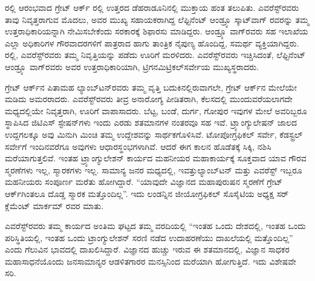 ರಲ್ಲಿ ಆರಂಭವಾದ ಗ್ರೇಟ್​ ಆರ್ಕ್ ರಲ್ಲಿ ಉತ್ತರದ ಡೆಹರಾಡೂನಿನಲ್ಲಿ ಮುಕ್ತಾಯ ಹಂತ ತಲುಪಿತು. ಎವರೆಸ್ಟ್​ರವರು ತಾವು ನಿವೃತ್ತರಾಗುವ ಮೊದಲು, ಅವರ ಮುಖ್ಯ ಸಹಾಯಕರಾಗಿದ್ದ ಲೆಫ್ಟಿನೆಂಟ್​ ಆಂಡ್ರ್ಯೂ ಸ್ಕಾಟ್​ ವಾಗ್​ ರವರನ್ನು ತಮ್ಮ ಉತ್ತರಾಧಿಕಾರಿಯನ್ನಾಗಿ ನೇಮಿಸಬೇಕೆಂದು ಸರಕಾರಕ್ಕೆ ಶಿಫಾರಸು ಮಾಡಿದ್ದರು. ಆಂಡ್ರ್ಯೂ ವಾಗ್​ರವರು ಸಹ ಇಲಾಖೆಯ ಎಲ್ಲಾ ಅಧಿಕಾರಿಗಳ ಗೌರವಾದರಗಳಿಗೆ ಪಾತ್ರರಾದ ಹಾಗು ತಾಂತ್ರಿಕ ನೈಪುಣ್ಯ ಹೊಂದಿದ್ದ, ಸಮರ್ಥ ವ್ಯಕ್ತಿಯಾಗಿದ್ದರು.  ರಲ್ಲಿ, ಎವರೆಸ್ಟ್​ರವರು ತಮ್ಮ ನಿವೃತ್ತಿಯನ್ನು ಪಡೆದು ಊರಿಗೆ ಮರಳಿದರು. ಎವರೆಸ್ಟ್​ರವರು ಇಚ್ಚಿಸಿದಂತೆ, ಲೆಫ್ಟಿನೆಂಟ್​ ಆಂಡ್ರ್ಯೂ ವಾಗ್​ರವರು ಅವರ ಉತ್ತರಾಧಿಕಾರಿಯಾಗಿ, ಟ್ರಿಗನಮಿಟ್ರಿಕಲ್​ ಸರ್ವೇಯ ಮುಖ್ಯಸ್ಥರಾದರು.

ಗ್ರೇಟ್​ ಆರ್ಕ್‌ನ ಪಿತಾಮಹ ಲ್ಯಾಂಬ್​ಟನ್​ರವರು ತಮ್ಮ ವೃತ್ತಿ ಬದುಕಿನಲ್ಲಿರುವಾಗಲೇ, ಗ್ರೇಟ್​ ಆರ್ಕ್‌ನ ಮೇಲೆಯೇ ಮಡಿದು ಅಮರರಾದರು. ಎವರೆಸ್ಟ್​ರವರು ತೀವ್ರ ಅನಾರೋಗ್ಯ ಪೀಡಿತರಾಗಿ, ಕೆಲಸದಲ್ಲಿ ಮುಂದುವರೆಯಲಾಗದೇ ಮಧ್ಯದಲ್ಲಿಯೇ ನಿವೃತ್ತರಾಗಿ, ಊರಿಗೆ ವಾಪಾಸಾದರು. ಬೆಟ್ಟ, ಬಂಡೆ, ದುರ್ಗ, ಗೋಪುರ ಇವುಗಳ ಮೇಲೆ ಅವರಿಬ್ಬರೂ ಸ್ಥಾಪಿಸಿದ ಜಿಟಿಎಸ್​ ಸ್ಟೇಷನ್​ಗಳು ಇಂದು ಎರಡು ಶತಮಾನಗಳ ನಂತರವೂ ಸಹ ಇವೆ. ಟ್ರ್ಯಾಂಗ್ಯುಲೇಷನ್​ ಜಾಲದ ಉದ್ದಗಲಕ್ಕೂ ಅವು ಮಿನುಗಿ ಮಿಂಚಿ ತಮ್ಮ ಉದ್ದೇಶವನ್ನು ಸಾರ್ಥಕಗೊಳಿಸಿವೆ. ಟೋಪೋಗ್ರಫಿಕಲ್​ ಸರ್ವೇ, ಕೆಡಸ್ಟ್ರಲ್​ ಸರ್ವೇಗೆ ಇಂದಿನವರೆಗೂ ಅವುಗಳು ಆಧಾರಸ್ಥಂಭಗಳಾಗಿವೆ. ಆದರೆ ಈಗ ಕಾಲನ ಹೊಡೆತಕ್ಕೆ ಸಿಕ್ಕಿ, ನಶಿಸಿ ಮರೆಯಾಗುತ್ತಲಿವೆ. ಇಂತಹ ಟ್ರ್ಯಾಂಗ್ಯುಲೇಶನ್​ ಕಾರ್ಯದ ಮಹನೀಯರ ಮಹಾಕಾರ್ಯಕ್ಕೆ ಸೂಕ್ತವಾದ ಯಾವ ಗೌರವ ಸ್ಮರಣೆಗಳು ಇಲ್ಲ, ಸ್ಮಾರಕಗಳು ಇಲ್ಲ. ಸಾಮಾನ್ಯ ಜನರ ಮಧ್ಯದಲ್ಲಿ, ಇವತ್ತು\break ಲ್ಯಾಂಬ್​ಟನ್​ ಮತ್ತು ಎವರೆಸ್ಟ್​ ಇಬ್ಬರೂ ಮಹನೀಯರು ಸಂಪೂರ್ಣ ಮರೆತು ಹೋಗಿದ್ದಾರೆ. “ಯಾವುದೇ ವಿಜ್ಞಾನದ ಮಹಾಪುರುಷನ ಸ್ಮರಣೆಗೆ ಗ್ರೇಟ್​ ಆರ್ಕ್‌ಗಿಂತಲೂ ದೊಡ್ಡ ಸ್ಮಾರಕ ಮತ್ತೊಂದಿಲ್ಲ”. ಇದು ಲಂಡನ್ನಿನ ಜೀಯೋಗ್ರಫಿಕಲ್​ ಸೊಸೈಟಿಯ ಅಧ್ಯಕ್ಷ ಸರ್​ ಕ್ಲೆಮೆಂಟ್​ ಮಾರ್ಕಮ್ ರವರ ಮಾತು.

ಎವರೆಸ್ಟ್​ರವರು ತಮ್ಮ ಕಾರ್ಯದ ಅಂತಿಮ ಘಟ್ಟದ ತಮ್ಮ ವರದಿಯಲ್ಲಿ “ಇಂತಹ ಒಂದು ದೇಶದಲ್ಲಿ, ಇಂತಹ ಒಂದು ಪರಿಸ್ಥಿತಿಯಲ್ಲಿ, ಇಂತಹ ಒಂದು ಟ್ರಾಂಗ್ಯುಲೇಶನ್​ ಸರಣಿ ನಡೆದ ಉದಾಹರಣೆಯು ದಾಖಲೆಯಲ್ಲಿ ಮತ್ತೊಂದಿಲ್ಲ” ಎಂದು ಗೆಲುವಿನ ಭಾವದಲ್ಲಿ ದಾಖಲಿಸಿದ್ದಾರೆ. ವಿಜ್ಞಾನದ ಹುಚ್ಚು ಇರುವ ಈ ಶತಮಾನದಲ್ಲಿ, ವಿಜ್ಞಾನ ಸಾಧಕರ ಮಹಾಸಾಧನೆಯೊಂದು ಜನಸಾಮಾನ್ಯರ ಆಡಳಿತಗಾರರ ಮನಸ್ಸಿನಿಂದ ಮರೆಯಾಗಿ ಹೋಗುತ್ತಿದೆ. ಇದು ವಿಶೇಷವೇ ಸರಿ.

